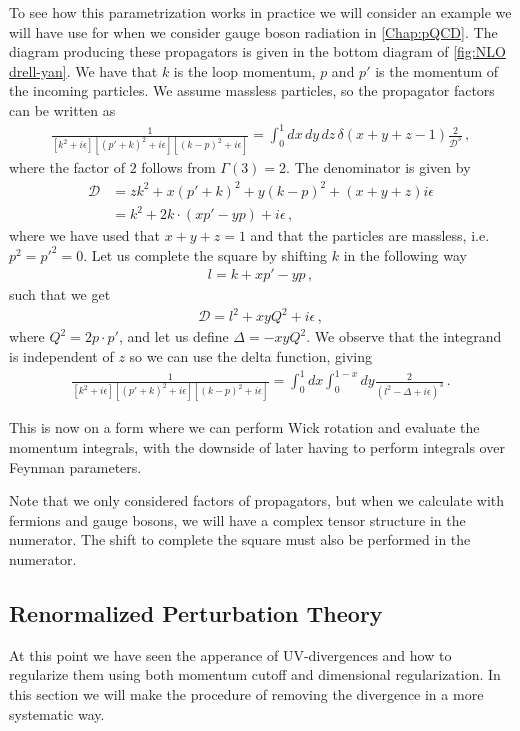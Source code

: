 To see how this parametrization works in practice we will consider an example we will have use for when we consider gauge boson radiation in \cref{Chap:pQCD}. The diagram producing these propagators is given in the bottom diagram of \cref{fig:NLO drell-yan}. We have that $k$ is the loop momentum, $p$ and $p'$ is the momentum of the incoming particles. We assume massless particles, so the propagator factors can be written as
\begin{align}
    \frac{1}{[k^{2}+i\epsilon][(p'+k)^{2}+i\epsilon][(k-p)^{2}+i\epsilon]}=\int_{0}^{1}dx\,dy\,dz\,\delta(x+y+z-1)\frac{2}{\mathcal{D}^{3}}\,,
\end{align}
where the factor of $2$ follows from $\Gamma(3)=2$. The denominator is given by
\begin{align}
    \mathcal{D}&=zk^{2}+x(p'+k)^{2}+y(k-p)^{2}+(x+y+z)i\epsilon\nonumber
    \\
    &=k^{2}+2k\cdot(xp'-yp)+i\epsilon\,,
\end{align}
where we have used that $x+y+z=1$ and that the particles are massless, i.e. $p^{2}=p'^{2}=0$. Let us complete the square by shifting $k$ in the following way
\begin{align}
    l=k+xp'-yp\,,
\end{align}
such that we get 
\begin{align}
    \mathcal{D}=l^{2}+xyQ^{2}+i\epsilon\,,
\end{align}
where $Q^{2}=2p\cdot p'$, and let us define $\Delta=-xyQ^{2}$. We observe that the integrand is independent of $z$ so we can use the delta function, giving
\begin{align}\label{eq:virtual gluon feynman parametrization}
    \frac{1}{[k^{2}+i\epsilon][(p'+k)^{2}+i\epsilon][(k-p)^{2}+i\epsilon]}=\int_{0}^{1}dx\int_{0}^{1-x}dy\frac{2}{(l^{2}-\Delta+i\epsilon)^{3}}\,.
\end{align}

This is now on a form where we can perform Wick rotation and evaluate the momentum integrals, with the downside of later having to perform integrals over Feynman parameters.

Note that we only considered factors of propagators, but when we calculate with fermions and gauge bosons, we will have a complex tensor structure in the numerator. The shift to complete the square must also be performed in the numerator.


\subsection{Renormalized Perturbation Theory}\label{sec:renormalized perturbation theory}
At this point we have seen the apperance of UV-divergences and how to regularize them using both momentum cutoff and dimensional regularization. In this section we will make the procedure of removing the divergence in a more systematic way.

